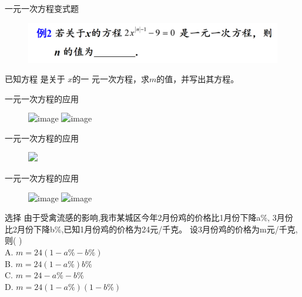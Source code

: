 \begin{frame}{一元一次方程变式题}
    \begin{figure}
        \includegraphics[width=.9\textwidth]{assets/new5.png}
    \end{figure}

    \begin{block}{}
        已知方程 是关于 $x$的一
        元一次方程，求$m$的值，并写出其方程。
    \end{block}
\end{frame}

\begin{frame}{一元一次方程的应用}
    \begin{figure}
        \includegraphics<1>[width=.9\textwidth]{assets/new6.png}
        \includegraphics<2>[width=.9\textwidth]{assets/new7.png}

    \end{figure}
\end{frame}

\begin{frame}{一元一次方程的应用}
    \begin{figure}
        \includegraphics<1>[width=.9\textwidth]{assets/new8.png}
    \end{figure}
\end{frame}

\begin{frame}{一元一次方程的应用}
    \begin{figure}
        \includegraphics<1>[width=.9\textwidth]{assets/new9.png}
        \includegraphics<2>[width=.9\textwidth]{assets/new10.png}

    \end{figure}
\end{frame}

\begin{frame}
    \begin{block}{选择}
        由于受禽流感的影响,我市某城区今年2月份鸡的价格比1月份下降a\%,
        3月份比2月份下降b\%,已知1月份鸡的价格为24元/千克。
        设3月份鸡的价格为m元/千克,则( )\\
        A. $m=24(1-a\%-b\%)$          \\
        B. $m=24(1-a\%)b\%$\\
        C. $m=24-a\%-b\%$            \\    
        D. $m=24(1-a\%)(1-b\%)$

    \end{block}
\end{frame}

